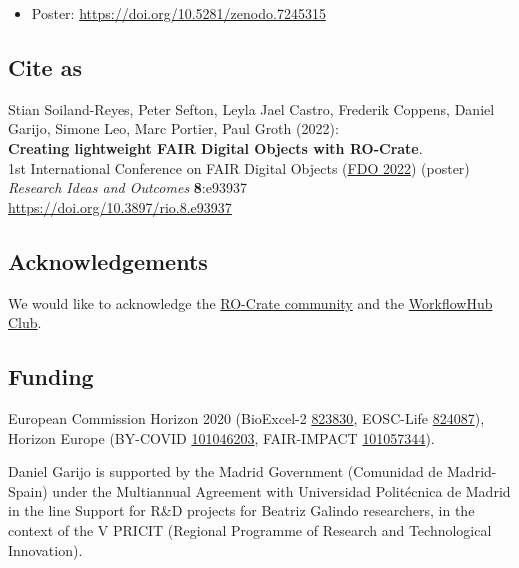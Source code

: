 \begin{itemize}
\tightlist
\item
  Poster: \url{https://doi.org/10.5281/zenodo.7245315}
\end{itemize}

\subsection*{Cite as}
Stian Soiland-Reyes, Peter Sefton, Leyla Jael Castro, Frederik Coppens,
Daniel Garijo, Simone Leo, Marc Portier, Paul Groth (2022):\\
\textbf{Creating lightweight FAIR Digital Objects with RO-Crate}.\\
1st International Conference on FAIR Digital Objects
(\href{https://www.fdo2022.org/}{FDO 2022}) (poster)\\
\emph{Research Ideas and Outcomes} \textbf{8}:e93937\\
\url{https://doi.org/10.3897/rio.8.e93937}

\hypertarget{acknowledgements-1}{%
\subsection*{Acknowledgements}\label{acknowledgements-1}}

We would like to acknowledge the
\href{https://www.researchobject.org/ro-crate/community.html}{RO-Crate
community} and the
\href{https://about.workflowhub.eu/project/acknowledgements/}{WorkflowHub
Club}.

\hypertarget{funding-1}{%
\subsection*{Funding}\label{funding-1}}

European Commission Horizon 2020 (BioExcel-2
\href{https://cordis.europa.eu/project/id/823830}{823830}, EOSC-Life
\href{https://cordis.europa.eu/project/id/824087}{824087}), Horizon
Europe (BY-COVID
\href{https://cordis.europa.eu/project/id/101046203}{101046203},
FAIR-IMPACT
\href{https://cordis.europa.eu/project/id/101057344}{101057344}).

Daniel Garijo is supported by the Madrid Government (Comunidad de
Madrid-Spain) under the Multiannual Agreement with Universidad
Politécnica de Madrid in the line Support for R\&D projects for Beatriz
Galindo researchers, in the context of the V PRICIT (Regional Programme
of Research and Technological Innovation).

